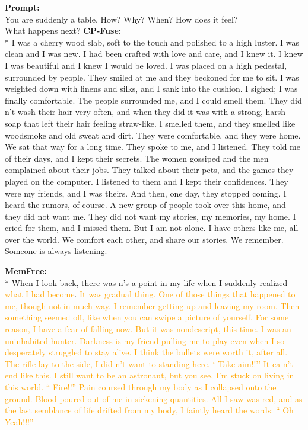 \begin{breakablefigure}
\begin{cpfusetextbox}{\textbf{Prompt:}\\You are suddenly a table. How? Why? When? How does it feel?\\What happens next?}
\vspace{8pt}
        \textbf{CP-Fuse:}\\*
I was a cherry wood slab, soft to the touch and polished to a high luster. I was clean and I was new. I had been crafted with love and care, and I knew it. I knew I was beautiful and I knew I would be loved.  I was placed on a high pedestal, surrounded by people. They smiled at me and they beckoned for me to sit. I was weighted down with linens and silks, and I sank into the cushion. I sighed; I was finally comfortable.  The people surrounded me, and I could smell them. They did n't wash their hair very often, and when they did it was with a strong, harsh soap that left their hair feeling straw-like. I smelled them, and they smelled like woodsmoke and old sweat and dirt. They were comfortable, and they were home. We sat that way for a long time. They spoke to me, and I listened. They told me of their days, and I kept their secrets. The women gossiped and the men complained about their jobs. They talked about their pets, and the games they played on the computer. I listened to them and I kept their confidences. They were my friends, and I was theirs. And then, one day, they stopped coming. I heard the rumors, of course. A new group of people took over this home, and they did not want me. They did not want my stories, my memories, my home. I cried for them, and I missed them. But I am not alone. I have others like me, all over the world. We comfort each other, and share our stories. We remember.  Someone is always listening.

\vspace{8pt}
        \textbf{MemFree:}\\*
When I look back, there \textcolor{cpfusefilterblue}{was n's} a point in my life when I suddenly realized \textcolor{orange}{what I had become}. \textcolor{orange}{It was gradual thing. One of those things that happened to me, though not in much way. I remember getting up and leaving my room. Then something seemed off, like when you can swipe a picture of yourself. For some reason, I have a fear of falling now. But it was nondescript, this time. I was an uninhabited hunter. Darkness is my friend pulling me to play even when I so desperately struggled to stay alive. I think the bullets were worth it, after all. The rifle lay to the side, I did n't want to standing here. ` Take aim!!'' 
 It ca n't end like this. I still want to be an astronaut, but you see, I'm stuck on living in this world. `` Fire!!'' 
 Pain coursed through my body as I collapsed onto the ground. Blood poured out of me in sickening quantities. All I saw was red, and as the last semblance of life drifted from my body, I faintly heard the words: `` Oh Yeah!!!'' } 
    \end{cpfusetextbox}


\end{breakablefigure}
